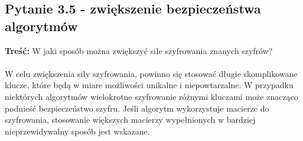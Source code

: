 \documentclass{article}
\begin{document}
\subsection*{Pytanie 3.5 - zwiększenie bezpieczeństwa algorytmów}
\textbf{Treść: } W jaki sposób można zwiększyć siłe szyfrowania znanych szyfrów?\\\\
W celu zwiększenia siły szyfrowania, powinno się stosować długie skomplikowane klucze, które będą w miare możliwości unikalne i niepowtarzalne. W przypadku
niektórych algorytmów wielokrotne szyfrowanie różnymi kluczami może znacząco podnieść bezpieczeństwo szyfru. Jeśli algorytm wykorzystuje macierze do szyfrowania, stosowanie większych macierzy wypełnionych w bardziej nieprzewidywalny
sposób jest wskazane. 
\end{document}
